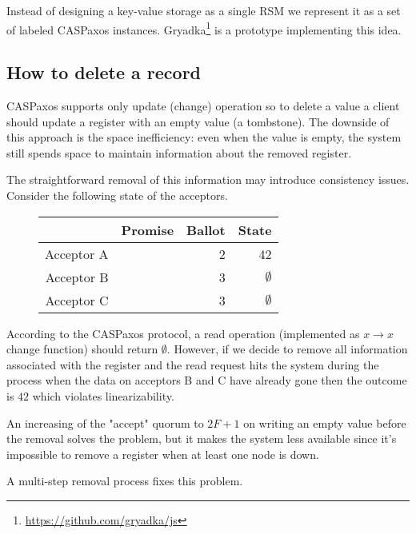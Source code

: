\documentclass[a4paper,USenglish]{lipics-v2018}
\theoremstyle{definition}
\begin{document}
    Instead of designing a key-value storage as a single RSM we represent it as a set of labeled CASPaxos instances. Gryadka\footnote{\href{https://github.com/gryadka/js}{https://github.com/gryadka/js}} is a prototype implementing this idea.

\subsection{How to delete a record}\label{deletion}

    CASPaxos supports only update (change) operation so to delete a value a client should update a register with an empty value (a tombstone). The downside of this approach is the space inefficiency: even when the value is empty, the system still spends space to maintain information about the removed register.

    The straightforward removal of this information may introduce consistency issues. Consider the following state of the acceptors.

    \begin{figure}[!h]
        \centering
        \begin{tabular}{ r|r|r|r }
            & Promise & Ballot & State \\ \hline
            Acceptor A && 2 & 42 \\
            Acceptor B && 3 & $\emptyset$ \\
            Acceptor C && 3 & $\emptyset$ \\
        \end{tabular}
    \end{figure}

    According to the CASPaxos protocol, a read operation (implemented as $x \to x$ change function) should return $\emptyset$. However, if we decide to remove all information associated with the register and the read request hits the system during the process when the data on acceptors B and C have already gone then the outcome is $42$ which violates linearizability.

    An increasing of the "accept" quorum to $2F+1$ on writing an empty value before the removal solves the problem, but it makes the system less available since it's impossible to remove a register when at least one node is down.

    A multi-step removal process fixes this problem.
\end{document}
